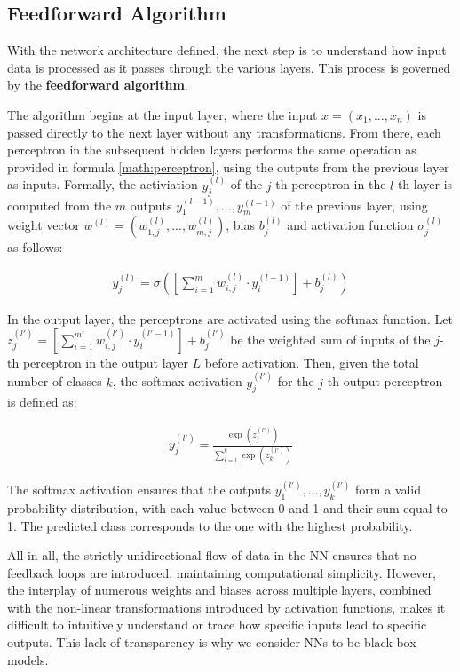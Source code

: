 \subsection{Feedforward Algorithm}
\label{sec:feedforward}
With the network architecture defined,
the next step is to understand how input data is processed as it passes through the various layers.
This process is governed by the \textbf{feedforward algorithm}.

The algorithm begins at the input layer,
where the input $x = (x_1, ..., x_n)$ is passed directly to the next layer without any transformations. 
From there, each perceptron in the subsequent hidden layers
performs the same operation as provided in formula \ref{math:perceptron},
using the outputs from the previous layer as inputs.
Formally, the activiation $y_j^{(l)}$ of the $j$-th perceptron in the $l$-th layer
is computed from the $m$ outputs $y_1^{(l-1)}, ..., y_m^{(l-1)}$ of the previous layer,
using weight vector $w^{(l)} = (w_{1,j}^{(l)}, ..., w_{m,j}^{(l)})$, bias $b_j^{(l)}$
and activation function $\sigma_j^{(l)}$ as follows:

\begin{align}
	y_j^{(l)} = \sigma\left(\left[\sum_{i = 1}^m w_{i,j}^{(l)} \cdot y_i^{(l-1)} \right] + b_j^{(l)}\right)
\end{align}

In the output layer, the perceptrons are activated using the softmax function.
Let $z_j^{(l')} = \left[\sum_{i = 1}^{m'} w_{i,j}^{(l')} \cdot y_i^{(l'-1)} \right] + b_j^{(l')}$ be 
the weighted sum of inputs of the $j$-th perceptron in the output layer $L$ before activation.
Then, given the total number of classes $k$, 
the softmax activation $y_j^{(l')}$ for the $j$-th output perceptron is defined as:

\begin{align}
  y_j^{(l')} = \frac{\exp(z_j^{(l')})}{\sum_{i=1}^k \exp(z_k^{(l')})}
\end{align}

The softmax activation ensures that the outputs $y_1^{(l')},...,y_k^{(l')}$
form a valid probability distribution,
with each value between 0 and 1 and their sum equal to 1.
The predicted class corresponds to the one with the highest probability.

All in all, the strictly unidirectional flow of data in the NN
ensures that no feedback loops are introduced, maintaining computational simplicity.
However, the interplay of numerous weights and biases across multiple layers,
combined with the non-linear transformations introduced by activation functions,
makes it difficult to intuitively understand or trace how specific inputs lead to specific outputs.
This lack of transparency is why we consider NNs to be black box models.

